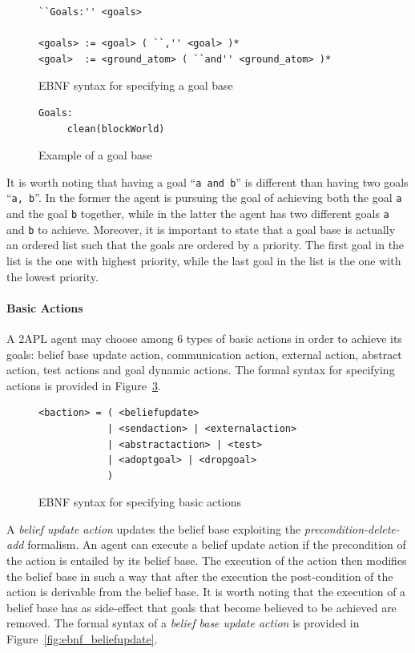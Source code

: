 \documentclass[a4paper]{article}
\begin{document}
\begin{figure}[htp]
\begin{verbatim}
``Goals:'' <goals>

<goals> := <goal> ( ``,'' <goal> )*
<goal>  := <ground_atom> ( ``and'' <ground_atom> )*
\end{verbatim}
\caption{EBNF syntax for specifying a goal base}
\label{fig:ebnf_goalbase}
\end{figure}

\begin{figure}[htp]
\begin{verbatim}
Goals:
     clean(blockWorld)
\end{verbatim}
\caption{Example of a goal base}
\label{fig:example_goalbase}
\end{figure}

It is worth noting that having a goal ``\texttt{a and b}'' is different than having two goals ``\texttt{a, b}''. In the former the agent is pursuing the goal of achieving both the goal \texttt{a} and the goal \texttt{b} together, while in the latter the agent has two different goals \texttt{a} and \texttt{b} to achieve. Moreover, it is important to state that a goal base is actually an ordered list such that the goals are ordered by a priority. The first goal in the list is the one with highest priority, while the last goal in the list is the one with the lowest priority.

\paragraph{Basic Actions}

A 2APL agent may choose among 6 types of basic actions in order to achieve its goals: belief base update action, communication action, external action, abstract action, test actions and goal dynamic actions. The formal syntax for specifying actions is provided in Figure~\ref{fig:ebnf_actions}.

\begin{figure}[htp]
\begin{verbatim}
<baction> = ( <beliefupdate>
            | <sendaction> | <externalaction> 
            | <abstractaction> | <test>
            | <adoptgoal> | <dropgoal>
            )
\end{verbatim}
\caption{EBNF syntax for specifying basic actions}
\label{fig:ebnf_actions}
\end{figure}

A \emph{belief update action} updates the belief base exploiting the \emph{precondition-delete-add} formalism. An agent can
execute a belief update action if the precondition of the action is entailed by its belief base. The execution of the action then modifies the belief base in such a way that after the execution the post-condition of the action is derivable from the belief base. It is worth noting that the execution of a belief base has as side-effect that goals that become believed to be achieved are removed. The formal syntax of a \emph{belief base update action} is provided in Figure~\ref{fig:ebnf_beliefupdate}.
\end{document}
